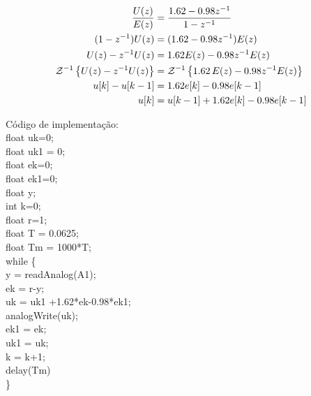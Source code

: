 \documentclass[12pt, a4paper]{article}
\begin{document}
\begin{align}
	\frac{U(z)}{E(z)} &= \frac{1.62-0.98z^{-1}}{1-z^{-1}}\\
	(1-z^{-1})U(z) &= (1.62-0.98z^{-1})E(z)\\
	U(z) - z^{-1}U(z) &= 1.62E(z) -0.98z^{-1}E(z)\\
	\mathcal{Z}^{-1}\left\{U(z) - z^{-1}U(z)\right\} &= \mathcal{Z}^{-1}\left\{1.62\,E(z) -0.98z^{-1}E(z)\right\}\\
	u[k] -u[k-1] &= 1.62 e[k] -0.98 e[k-1]\\
	u[k] &= u[k-1]+ 1.62 e[k] -0.98 e[k-1]
\end{align}

\newcommand\tab[1][1cm]{\hspace*{#1}}
Código de implementação:\\
	float uk=0;\\
	float uk1 = 0;\\
	float ek=0;\\
	float ek1=0;\\
	float y;\\
	int k=0;\\
	float r=1;\\
	float T = 0.0625;\\
	float Tm = 1000*T;\\
	while \{\\
		\tab y = readAnalog(A1);\\
		\tab ek = r-y;\\
		\tab uk = uk1 +1.62*ek-0.98*ek1;\\
		\tab analogWrite(uk);\\
		\tab ek1 = ek;\\
		\tab uk1 = uk;\\
		\tab k = k+1;\\
		\tab delay(Tm)	\\
	\}\\
\end{document}
